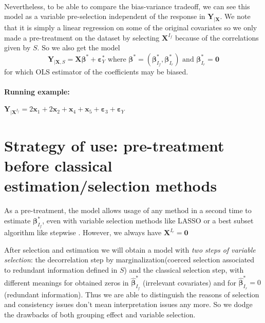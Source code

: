 \documentclass[12pt,a4paper]{report}
\begin{document}
\\
Nevertheless, to be able to compare the bias-variance tradeoff, we can see this model as a variable pre-selection independent of the response in $\boldsymbol{Y}_{|\boldsymbol{X}}$.
We note that it is simply a linear regression on some of the original covariates so we only made a pre-treatment on the dataset by selecting $\boldsymbol{X}^{I_f}$ because of the correlations given by $S$. So we also get the model
\begin{equation}
\boldsymbol{Y}_{|\boldsymbol{X},S}=\boldsymbol{X}\boldsymbol{\beta}^*+\boldsymbol{\varepsilon}_Y^* \textrm{ where }\boldsymbol{\beta}^*=(\boldsymbol{\beta}_{I_f}^*,\boldsymbol{\beta}_{I_r}^*) \textrm{ and } \boldsymbol{\beta}_{I_r}^*=\boldsymbol{0}
\end{equation}
	for which OLS estimator of the coefficients may be biased.  

\paragraph{Running example:} $\boldsymbol{Y}_{|\boldsymbol{X}^{I_f}}= 2\boldsymbol{x}_1+2\boldsymbol{x}_2+\boldsymbol{x}_4+\boldsymbol{x}_5+\boldsymbol{\varepsilon}_3 +\boldsymbol{\varepsilon}_Y$




\section{Strategy of use: pre-treatment before classical estimation/selection methods}\label{interpretation}

As a pre-treatment, the model allows usage of any method in a second time to estimate $\boldsymbol{\beta}_{I_f}^*$, even with variable selection methods like LASSO or a best subset algorithm like stepwise \cite{seber2012linear}. However, we always have $\boldsymbol{X}^{I_r}=\boldsymbol{0}$

After selection and estimation we will obtain a model with { \it two steps of variable selection}: the decorrelation step by marginalization(coerced selection associated to redundant information defined in $S$) and the classical selection step, with different meanings for obtained zeros in $\hat{\boldsymbol{\beta}}^*_{I_f}$ (irrelevant covariates) and for $\hat{\boldsymbol{\beta}}^*_{I_r}=0$ (redundant information). 
 Thus we are able to distinguish the reasons of selection and consistency issues don't mean interpretation issues any more. So we dodge the drawbacks of both grouping effect and variable selection.
\end{document}
